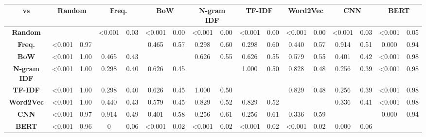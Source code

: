 \begin{landscape}
\begin{table}[]
	\centering
	\caption{}
	\label{tab:wilcoxon-chrome}
	\begin{tabular}{@{}ccccccccccccccccc@{}}
		\toprule
		\textbf{vs} &
		\multicolumn{2}{c}{\textbf{Random}} &
		\multicolumn{2}{c}{\textbf{Freq.}} &
		\multicolumn{2}{c}{\textbf{BoW}} &
		\multicolumn{2}{c}{\textbf{N-gram IDF}} &
		\multicolumn{2}{c}{\textbf{TF-IDF}} &
		\multicolumn{2}{c}{\textbf{Word2Vec}} &
		\multicolumn{2}{c}{\textbf{CNN}} &
		\multicolumn{2}{c}{\textbf{BERT}} \\ \midrule
		\textbf{Random} &
		&
		&
		\textless{}0.001 &
		0.03 &
		\textless{}0.001 &
		0.00 &
		\textless{}0.001 &
		0.00 &
		\textless{}0.001 &
		0.00 &
		\textless{}0.001 &
		0.00 &
		\textless{}0.001 &
		0.03 &
		\textless{}0.001 &
		0.05 \\
		\textbf{Freq.} &
		\textless{}0.001 &
		0.97 &
		&
		&
		0.465 &
		0.57 &
		0.298 &
		0.60 &
		0.298 &
		0.60 &
		0.440 &
		0.57 &
		0.914 &
		0.51 &
		0.000 &
		0.94 \\
		\textbf{BoW} &
		\textless{}0.001 &
		1.00 &
		0.465 &
		0.43 &
		&
		&
		0.626 &
		0.55 &
		0.626 &
		0.55 &
		0.579 &
		0.55 &
		0.401 &
		0.42 &
		\textless{}0.001 &
		0.98 \\
		\textbf{N-gram IDF} &
		\textless{}0.001 &
		1.00 &
		0.298 &
		0.40 &
		0.626 &
		0.45 &
		&
		&
		1.000 &
		0.50 &
		0.828 &
		0.48 &
		0.256 &
		0.39 &
		\textless{}0.001 &
		0.98 \\
		\textbf{TF-IDF} &
		\textless{}0.001 &
		1.00 &
		0.298 &
		0.40 &
		0.626 &
		0.45 &
		1.000 &
		0.50 &
		&
		&
		0.829 &
		0.48 &
		0.256 &
		0.39 &
		\textless{}0.001 &
		0.98 \\
		\textbf{Word2Vec} &
		\textless{}0.001 &
		1.00 &
		0.440 &
		0.43 &
		0.579 &
		0.45 &
		0.829 &
		0.52 &
		0.829 &
		0.52 &
		&
		&
		0.336 &
		0.41 &
		\textless{}0.001 &
		0.98 \\
		\textbf{CNN} &
		\textless{}0.001 &
		0.97 &
		0.914 &
		0.49 &
		0.401 &
		0.58 &
		0.256 &
		0.61 &
		0.256 &
		0.61 &
		0.336 &
		0.59 &
		&
		&
		0.000 &
		0.94 \\
		\textbf{BERT} &
		\textless{}0.001 &
		0.96 &
		0 &
		0.06 &
		\textless{}0.001 &
		0.02 &
		\textless{}0.001 &
		0.02 &
		\textless{}0.001 &
		0.02 &
		\textless{}0.001 &
		0.02 &
		0.000 &
		0.06 &
		&
		\\ \bottomrule
	\end{tabular}
\end{table}


\end{landscape}
